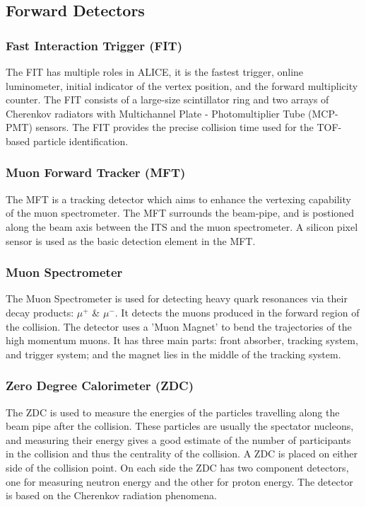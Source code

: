 \documentclass[12pt,a4paper,twoside]{report}
\begin{document}
\subsection{Forward Detectors}
\subsubsection{Fast Interaction Trigger (FIT)}
The FIT has multiple roles in ALICE, it is the fastest trigger, online luminometer, initial indicator of the vertex position, and the forward multiplicity counter. The FIT consists of a large-size scintillator ring and two arrays of Cherenkov radiators with Multichannel Plate - Photomultiplier Tube (MCP-PMT) sensors. The FIT provides the precise collision time used for the TOF-based particle identification. \cite{Ref:ALICE-detectors-FIT}
\subsubsection{Muon Forward Tracker (MFT)}
The MFT is a tracking detector which aims to enhance the vertexing capability of the muon spectrometer. The MFT surrounds the beam-pipe, and is postioned along the beam axis between the ITS and the muon spectrometer. A silicon pixel sensor is used as the basic detection element in the MFT. \cite{Ref:ALICE-detectors-MFT}
\subsubsection{Muon Spectrometer}
The Muon Spectrometer is used for detecting heavy quark resonances via their decay products: $\mu^{+}$ \& $\mu^{-}$. It detects the muons produced in the forward region of the collision. The detector uses a 'Muon Magnet' to bend the trajectories of the high momentum muons. It has three main parts: front absorber, tracking system, and trigger system; and the magnet lies in the middle of the tracking system.\cite{Ref:ALICE-detectors-MS}
\subsubsection{Zero Degree Calorimeter (ZDC)}
The ZDC is used to measure the energies of the particles travelling along the beam pipe after the collision. These particles are usually the spectator nucleons, and measuring their energy gives a good estimate of the number of participants in the collision and thus the centrality of the collision. A ZDC is placed on either side of the collision point. On each side the ZDC has two component detectors, one for measuring neutron energy and the other for proton energy. The detector is based on the Cherenkov radiation phenomena.\cite{Ref:ALICE-detectors-ZDC}
\end{document}
